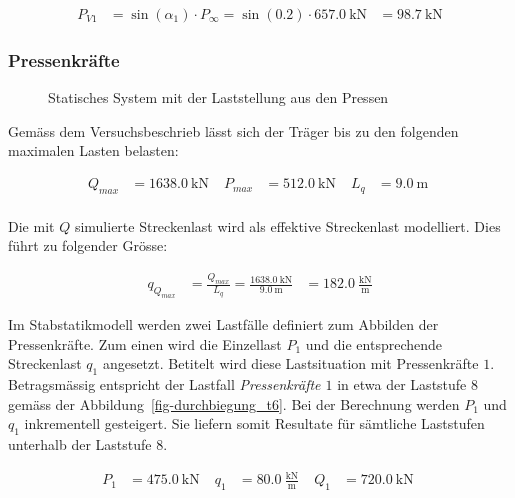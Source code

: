 \documentclass[
  11pt,
  letterpaper,
]{scrreprt}
\begin{document}
$$
\begin{aligned}
P_{V1} &= \sin \left( \alpha_{1} \right) \cdot P_{\infty}  = \sin \left( 0.2 \right) \cdot 657.0\ \mathrm{kN} &= 98.7\ \mathrm{kN}  
\end{aligned}
$$

\subsubsection{Pressenkräfte}\label{pressenkruxe4fte}

\begin{figure}[H]


\caption{\label{fig-t6_lastfall_versuch}Statisches System mit der
Laststellung aus den Pressen}

\end{figure}%

Gemäss dem Versuchsbeschrieb lässt sich der Träger bis zu den folgenden
maximalen Lasten belasten:

$$
\begin{aligned}
Q_{max} &= 1638.0\ \mathrm{kN} \; 
 &P_{max} &= 512.0\ \mathrm{kN} \; 
 &L_{q} &= 9.0\ \mathrm{m} \; 
\\[11pt]
\end{aligned}
$$

Die mit \(Q\) simulierte Streckenlast wird als effektive Streckenlast
modelliert. Dies führt zu folgender Grösse:

$$
\begin{aligned}
q_{Q_{max}} &= \frac{ Q_{max} }{ L_{q} }  = \frac{ 1638.0\ \mathrm{kN} }{ 9.0\ \mathrm{m} } &= 182.0\ \frac{\mathrm{kN}}{\mathrm{m}}  
\end{aligned}
$$

Im Stabstatikmodell werden zwei Lastfälle definiert zum Abbilden der
Pressenkräfte. Zum einen wird die Einzellast \(P_{1}\) und die
entsprechende Streckenlast \(q_{1}\) angesetzt. Betitelt wird diese
Lastsituation mit Pressenkräfte \(1\). Betragsmässig entspricht der
Lastfall \emph{Pressenkräfte \(1\)} in etwa der Laststufe 8 gemäss der
Abbildung~\ref{fig-durchbiegung_t6}. Bei der Berechnung werden \(P_1\)
und \(q_1\) inkrementell gesteigert. Sie liefern somit Resultate für
sämtliche Laststufen unterhalb der Laststufe 8.

$$
\begin{aligned}
P_{1} &= 475.0\ \mathrm{kN} \; 
 &q_{1} &= 80.0\ \frac{\mathrm{kN}}{\mathrm{m}} \; 
 &Q_{1} &= 720.0\ \mathrm{kN} \; 
\\[11pt]
\end{aligned}
$$
\end{document}
